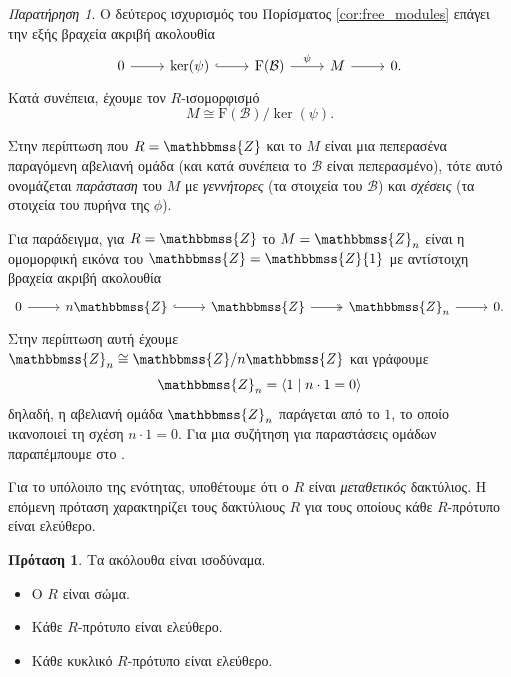 \documentclass[12pt,a4paper,reqno]{amsart}
\theoremstyle{definition}
\newtheorem{proposition}[theorem]{Πρόταση}
\theoremstyle{remark}
\newtheorem*{remark}{Παρατήρηση}
\numberwithin{theorem}{section}
\numberwithin{exercise}{section}
\numberwithin{equation}{section}
\newcommand{\ZZ}{\mathbbmss{Z}}
\newcommand{\bB}{\mathcal{B}}
\newcommand{\rmF}{\mathrm{F}}
\begin{document}
\begin{remark}
    Ο δεύτερος ισχυρισμός του Πορίσματος \ref{cor:free_modules} επάγει την εξής βραχεία ακριβή ακολουθία 
    \[
    \begin{tikzcd}
        0 \arrow[r] & \ker(\psi) \arrow[r, hook] & \rmF(\bB) \arrow[r, "\psi"] & M \arrow[r] & 0.
    \end{tikzcd}
    \]
    Κατά συνέπεια, έχουμε τον $R$-ισομορφισμό 
    \[
    M \cong \rmF(\bB) / \ker(\psi).
    \]

    Στην περίπτωση που $R = \ZZ$ και το $M$ είναι μια πεπερασένα παραγόμενη αβελιανή ομάδα (και κατά συνέπεια το $\bB$ είναι πεπερασμένο), τότε αυτό ονομάζεται \emph{παράσταση} του $M$ με \emph{γεννήτορες} (τα στοιχεία του $\bB$) και \emph{σχέσεις} (τα στοιχεία του πυρήνα της $\phi$). 

    Για παράδειγμα, για $R = \ZZ$ το $M = \ZZ_n$ είναι η ομομορφική εικόνα του $\ZZ = \ZZ\{1\}$ με αντίστοιχη βραχεία ακριβή ακολουθία 
    \[
    \begin{tikzcd}
        0 \arrow[r] & n\ZZ \arrow[r, hook] & \ZZ \arrow[r, two heads] & \ZZ_n \arrow[r] & 0.
    \end{tikzcd}
    \]
    Στην περίπτωση αυτή έχουμε $\ZZ_n \cong \ZZ / n\ZZ$ και γράφουμε 
    \[
    \ZZ_n = \langle 1 \mid n \cdot 1 = 0 \rangle
    \]
    δηλαδή, η αβελιανή ομάδα $\ZZ_n$ παράγεται από το $1$, το οποίο ικανοποιεί τη σχέση $n\cdot1=0$. Για μια συζήτηση για παραστάσεις ομάδων παραπέμπουμε στο \cite[Ενότητα~6.3]{DF04}.
\end{remark}

Για το υπόλοιπο της ενότητας, υποθέτουμε ότι ο $R$ είναι \emph{μεταθετικός} δακτύλιος. Η επόμενη πρόταση χαρακτηρίζει τους δακτύλιους $R$ για τους οποίους κάθε $R$-πρότυπο είναι ελεύθερο.
\begin{proposition}
    \label{prop:every_module_is_free}
    Τα ακόλουθα είναι ισοδύναμα.
    \begin{itemize}
        \item[(1)] Ο $R$ είναι σώμα.
        \item[(2)] Κάθε $R$-πρότυπο είναι ελεύθερο.
        \item[(3)] Κάθε κυκλικό $R$-πρότυπο είναι ελεύθερο. 
    \end{itemize}
\end{proposition}
\end{document}
